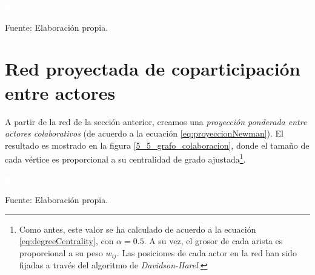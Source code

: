 \documentclass[letterpaper, 11pt]{book}
\theoremstyle{definition}
\theoremstyle{remark}
\begin{document}
\pagebreak
\hspace{-1.5em} \begin{minipage}{\linewidth}
\centering\bigskip
{} \label{5_4_clustering_local_bipartito}

\includegraphics[scale=0.1]{img/null.png}
\vspace{40em}
\par\bigskip
\small Fuente: Elaboración propia.
\end{minipage}\bigskip






\section{Red proyectada de coparticipación entre actores}
\label{sec:RedProyectada_coparticipación}

A partir de la red de la sección anterior, creamos una \emph{proyección ponderada entre actores colaborativos} (de acuerdo a la ecuación \ref{eq:proyeccionNewman}). 
El resultado es mostrado en la figura \ref{5_5_grafo_colaboracion}, donde el tamaño de cada vértice es proporcional a su centralidad de grado ajustada\footnote{
    Como antes, este valor se ha calculado de acuerdo a la ecuación \ref{eq:degreeCentrality}, con $\alpha = 0.5$. 
    A su vez, el grosor de cada arista es proporcional a su peso $w_{ij}$. 
    Las posiciones de cada actor en la red han sido fijadas a través del algoritmo de \emph{Davidson-Harel}. 
}. 


\begin{minipage}{\linewidth}
\centering
{} \label{5_5_grafo_colaboracion}

\includegraphics[scale=0.1]{img/null.png}
\vspace{41em}
\par\bigskip
\small Fuente: Elaboración propia.
\end{minipage}\bigskip
\end{document}
